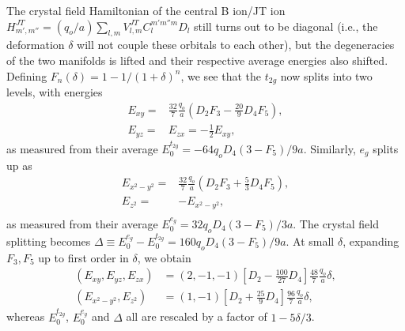 \documentclass[a4paper,prb,twocolumn]{revtex4-1}  %
\newcommand{\com}[1]{}
\begin{document}
The crystal field Hamiltonian of the central B ion/JT ion
${H_{m',m''}^{JT} = (q_o/a)\sum_{l,m} V_{l,m}^{JT} C_{l}^{m'm''m} D_{l}}$
still turns out to be diagonal 
(i.e., the deformation $\delta$
will not couple these orbitals to each other),
but the degeneracies of the two manifolds is lifted
and their respective average energies also shifted.
Defining 
$F_n(\delta) = 1-1/(1+\delta)^n$,
we see that
the $t_{2g}$ now splits into two levels,
with energies
\begin{align}
E_{xy} =&
\frac{32}{7}\frac{q_o}{a} \left(
 D_2F_3 - \frac{20}{9}D_4F_5 
\right),\\
E_{yz} =& E_{zx} = -\frac{1}{2} E_{xy},
\end{align}
as measured from their average 
$E_0^{t_{2g}} = -64q_oD_4 \left(3-F_5\right)/9a$.
Similarly, $e_g$ splits up as
\begin{align}
E_{x^2-y^2}=&
\frac{32}{7}\frac{q_o}{a} \left(D_2F_3+\frac{5}{3} D_4F_5\right),\\
E_{z^2}=&-E_{x^2-y^2},\\
\end{align}
as measured from their average 
$E_0^{e_{g}} = 32 q_oD_4 \left(3-F_5\right)/3a$.
The crystal field splitting becomes
$\Delta \equiv E_0^{e_{g}}-E_0^{t_{2g}}=
160q_oD_4\left(3-F_5\right)/9a$.
At small $\delta$, 
expanding 
$F_3,F_5$
 up to first order in $\delta$,
we obtain
\begin{align}
\label{eq:JTt2g}
(E_{xy},E_{yz},E_{zx})&= (2, -1, -1)
\left[D_2-\frac{100}{27}  D_4\right]\frac{48}{7}\frac{q_o}{a}\delta,\\
\label{eq:JTeg}
(E_{x^2-y^2},E_{z^2})&=(1,-1)
\left[D_2+\frac{25}{9} D_4\right]\frac{96}{7}\frac{q_o}{a}\delta,
\end{align}
whereas
$E_0^{t_{2g}}$, $E_0^{e_{g}}$ and $\Delta$ all are rescaled by a factor of ${1-5\delta/3}$.


\com{
The crystal field splitting becomes
\begin{align}
E_0^{t_{2g}},E_0^{e_{g}},\Delta \to (1-\frac{5}{3}\delta)E_0^{t_{2g}}
E_0^{e_{g}} \to (1-\frac{5}{3}\delta) E_0^{e_{g}}
\Delta \to (1-\frac{5}{3}\delta)\Delta
\end{align}
}
\end{document}

